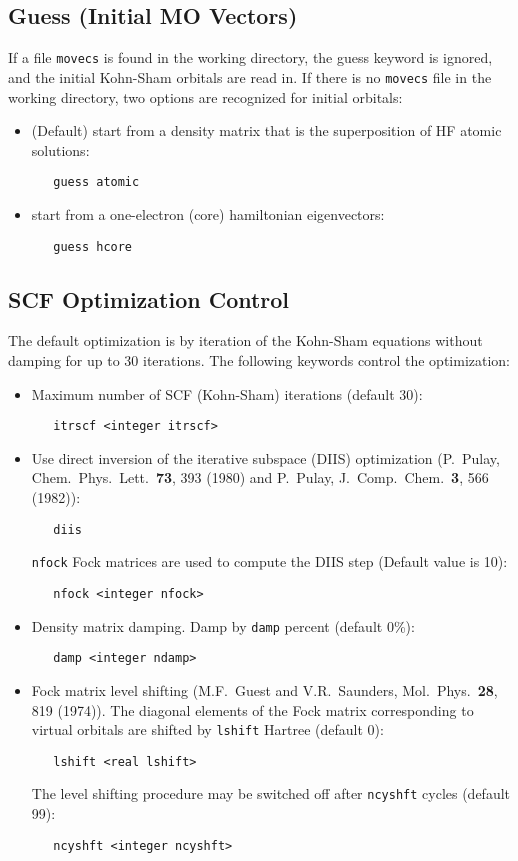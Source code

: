 \subsection{Guess (Initial MO Vectors)}

If a file {\tt movecs} is found in the working directory, the 
guess keyword is ignored, and the initial Kohn-Sham orbitals are read in.
If there is no {\tt movecs} file in the working directory,
two options are recognized for initial orbitals:
\begin{itemize}
\item (Default) start from a density matrix that is the superposition of HF
  atomic solutions:
\begin{verbatim}
   guess atomic
\end{verbatim}
\item start from a one-electron (core) hamiltonian eigenvectors:
\begin{verbatim}
   guess hcore
\end{verbatim}
\end{itemize}

\subsection{SCF Optimization Control}

The default optimization is by iteration of the Kohn-Sham equations
without damping for up to 30 iterations.  The following keywords
control the optimization:
\begin{itemize}
\item Maximum number of SCF (Kohn-Sham) iterations (default 30):
\begin{verbatim}
   itrscf <integer itrscf>
\end{verbatim}
\item Use direct inversion of the iterative subspace (DIIS) optimization
  (P.~Pulay,  Chem.\ Phys.\ Lett.\ {\bf 73}, 393 (1980) and P.~Pulay,
  J.~Comp.~Chem.~{\bf 3}, 566 (1982)):
\begin{verbatim}
   diis
\end{verbatim}
  {\tt nfock} Fock matrices are used to compute the DIIS step
  (Default value is 10):
\begin{verbatim}
   nfock <integer nfock>
\end{verbatim}
\item Density matrix damping. Damp by {\tt damp} percent (default 0\%):
\begin{verbatim}
   damp <integer ndamp>  
\end{verbatim}
\item Fock matrix level shifting (M.F.~Guest and V.R.~Saunders,
  Mol.~Phys.~{\bf 28}, 819 (1974)). The diagonal elements of
the Fock matrix corresponding to virtual orbitals are shifted by 
{\tt  lshift} Hartree (default 0):
\begin{verbatim}
   lshift <real lshift> 
\end{verbatim}
The level shifting procedure may be switched off after {\tt ncyshft} cycles
(default 99):
\begin{verbatim}
   ncyshft <integer ncyshft> 
\end{verbatim}
\end{itemize}

